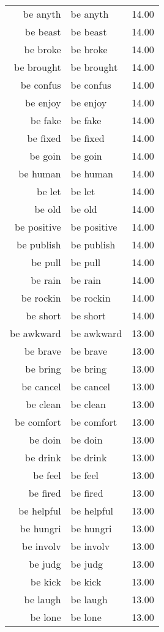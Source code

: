 \begin{table}[ht]
\begin{tabular}{rlr}
  be anyth & be anyth & 14.00 \\ 
  be beast & be beast & 14.00 \\ 
  be broke & be broke & 14.00 \\ 
  be brought & be brought & 14.00 \\ 
  be confus & be confus & 14.00 \\ 
  be enjoy & be enjoy & 14.00 \\ 
  be fake & be fake & 14.00 \\ 
  be fixed & be fixed & 14.00 \\ 
  be goin & be goin & 14.00 \\ 
  be human & be human & 14.00 \\ 
  be let & be let & 14.00 \\ 
  be old & be old & 14.00 \\ 
  be positive & be positive & 14.00 \\ 
  be publish & be publish & 14.00 \\ 
  be pull & be pull & 14.00 \\ 
  be rain & be rain & 14.00 \\ 
  be rockin & be rockin & 14.00 \\ 
  be short & be short & 14.00 \\ 
  be awkward & be awkward & 13.00 \\ 
  be brave & be brave & 13.00 \\ 
  be bring & be bring & 13.00 \\ 
  be cancel & be cancel & 13.00 \\ 
  be clean & be clean & 13.00 \\ 
  be comfort & be comfort & 13.00 \\ 
  be doin & be doin & 13.00 \\ 
  be drink & be drink & 13.00 \\ 
  be feel & be feel & 13.00 \\ 
  be fired & be fired & 13.00 \\ 
  be helpful & be helpful & 13.00 \\ 
  be hungri & be hungri & 13.00 \\ 
  be involv & be involv & 13.00 \\ 
  be judg & be judg & 13.00 \\ 
  be kick & be kick & 13.00 \\ 
  be laugh & be laugh & 13.00 \\ 
  be lone & be lone & 13.00 \\ 

\end{tabular}
\end{table}
